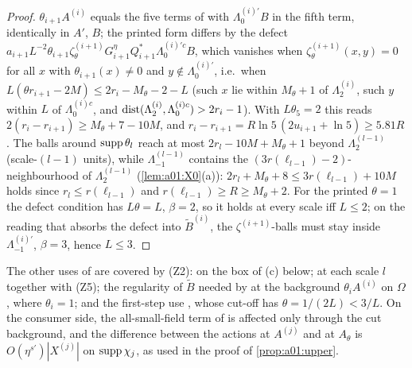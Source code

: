 \begin{proof}
$\theta_{i+1}A^{(i)}$ equals the five terms of \cite[(2.89)]{Ba2} with $\Lambda_0^{(i)\prime}B$ in the fifth term, identically in $A'$, $B$; the printed form differs by the defect $a_{i+1}L^{-2}\theta_{i+1}\zeta^{(i+1)}_\theta G^\eta_{i+1}Q^*_{i+1}\Lambda_0^{(i)\prime c}B$, which vanishes when $\zeta^{(i+1)}_\theta(x,y)=0$ for all $x$ with $\theta_{i+1}(x)\ne0$ and $y\notin\Lambda_0^{(i)\prime}$, i.e.\ when $L(\theta r_{i+1}-2M)\le2r_i-M_\theta-2-L$ (such $x$ lie within $M_\theta+1$ of $\Lambda_2^{(i)}$, such $y$ within $L$ of $\Lambda_0^{(i)c}$, and $\operatorname{dist}(\Lambda_2^{(i)},\Lambda_0^{(i)c})>2r_i-1$). With $L\theta_5=2$ this reads $2(r_i-r_{i+1})\ge M_\theta+7-10M$, and $r_i-r_{i+1}=R\ln5\,(2u_{i+1}+\ln5)\ge5.81R$. The balls around $\operatorname{supp}\theta_l$ reach at most $2r_l-10M+M_\theta+1$ beyond $\Lambda_2^{(l-1)}$ (scale-$(l-1)$ units), while $\Lambda_{-1}^{(l-1)}$ contains the $(3r(\ell_{l-1})-2)$-neighbourhood of $\Lambda_2^{(l-1)}$ (\cref{lem:a01:X0}(a)): $2r_l+M_\theta+8\le3r(\ell_{l-1})+10M$ holds since $r_l\le r(\ell_{l-1})$ and $r(\ell_{l-1})\ge R\ge M_\theta+2$. For the printed $\theta=1$ the defect condition has $L\theta=L$, $\beta=2$, so it holds at every scale iff $L\le2$; on the reading that absorbs the defect into $\tilde B^{(i)}$, the $\zeta^{(i+1)}$-balls must stay inside $\Lambda_{-1}^{(i)\prime}$, $\beta=3$, hence $L\le3$.
\end{proof}
The other uses of \cite[Lemma~2.3]{Ba2} are covered by (Z2): \cite[(2.68)]{Ba2} on the box of (c) below; \cite[(2.95)--(2.98)]{Ba2} at each scale $l$ together with (Z5); the regularity of $\tilde B$ needed by \cite[Prop.~1]{Ba3} at the background $\theta_iA^{(i)}$ on $\Omega$, where $\theta_i=1$; and the first-step use \cite[(2.25)]{Ba2}, whose cut-off has $\theta=1/(2L)<3/L$. On the consumer side, the all-small-field term of \cite[(3.4)]{K1} is affected only through the cut background, and the difference between the actions at $A^{(j)}$ and at $A_\theta$ is $O(\eta^{s'})|X^{(j)}|$ on $\operatorname{supp}\chi_j$, as used in the proof of \cref{prop:a01:upper}.

